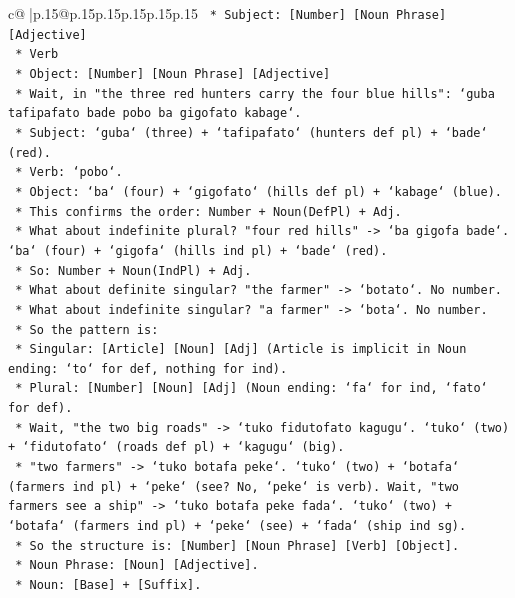 \documentclass{article}
\begin{document}
{\begin{supertabular}{c@{$\;$}|p{.15\linewidth}@{}p{.15\linewidth}p{.15\linewidth}p{.15\linewidth}p{.15\linewidth}p{.15\linewidth}}
{{{\texttt{    *   Subject: {[}Number{]} {[}Noun Phrase{]} {[}Adjective{]}} \\
\texttt{    *   Verb} \\
\texttt{    *   Object: {[}Number{]} {[}Noun Phrase{]} {[}Adjective{]}} \\
\texttt{    *   Wait, in "the three red hunters carry the four blue hills": `guba tafipafato bade pobo ba gigofato kabage`.} \\
\texttt{    *   Subject: `guba` (three) + `tafipafato` (hunters def pl) + `bade` (red).} \\
\texttt{    *   Verb: `pobo`.} \\
\texttt{    *   Object: `ba` (four) + `gigofato` (hills def pl) + `kabage` (blue).} \\
\texttt{    *   This confirms the order: Number + Noun(DefPl) + Adj.} \\
\texttt{    *   What about indefinite plural? "four red hills" {-}> `ba gigofa bade`. `ba` (four) + `gigofa` (hills ind pl) + `bade` (red).} \\
\texttt{    *   So: Number + Noun(IndPl) + Adj.} \\
\texttt{    *   What about definite singular? "the farmer" {-}> `botato`. No number.} \\
\texttt{    *   What about indefinite singular? "a farmer" {-}> `bota`. No number.} \\
\texttt{    *   So the pattern is:} \\
\texttt{        *   Singular: {[}Article{]} {[}Noun{]} {[}Adj{]} (Article is implicit in Noun ending: `to` for def, nothing for ind).} \\
\texttt{        *   Plural: {[}Number{]} {[}Noun{]} {[}Adj{]} (Noun ending: `fa` for ind, `fato` for def).} \\
\texttt{        *   Wait, "the two big roads" {-}> `tuko fidutofato kagugu`. `tuko` (two) + `fidutofato` (roads def pl) + `kagugu` (big).} \\
\texttt{        *   "two farmers" {-}> `tuko botafa peke`. `tuko` (two) + `botafa` (farmers ind pl) + `peke` (see? No, `peke` is verb). Wait, "two farmers see a ship" {-}> `tuko botafa peke fada`. `tuko` (two) + `botafa` (farmers ind pl) + `peke` (see) + `fada` (ship ind sg).} \\
\texttt{        *   So the structure is: {[}Number{]} {[}Noun Phrase{]} {[}Verb{]} {[}Object{]}.} \\
\texttt{        *   Noun Phrase: {[}Noun{]} {[}Adjective{]}.} \\
\texttt{        *   Noun: {[}Base{]} + {[}Suffix{]}.} \\
}}}
\end{supertabular}}
\end{document}
